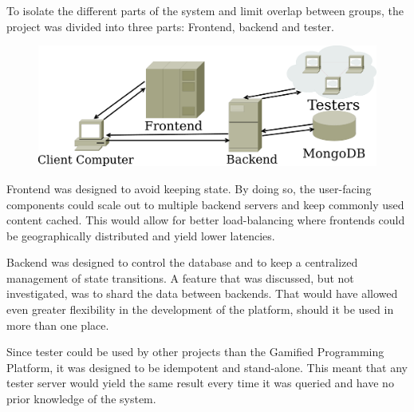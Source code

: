 To isolate the different parts of the system and limit overlap between groups, the project was divided into three parts: Frontend, backend and tester.
\begin{figure}
\includegraphics[width=.9\textwidth]{img/architecture.pdf}
\end{figure}

Frontend was designed to avoid keeping state. By doing so, the user-facing components could scale out to multiple backend servers and keep commonly used content cached. This would allow for better load-balancing where frontends could be geographically distributed and yield lower latencies.

Backend was designed to control the database and to keep a centralized management of state transitions. A feature that was discussed, but not investigated, was to shard the data between backends. That would have allowed even greater flexibility in the development of the platform, should it be used in more than one place.

Since tester could be used by other projects than the Gamified Programming Platform, it was designed to be idempotent and stand-alone. This meant that any tester server would yield the same result every time it was queried and have no prior knowledge of the system.






